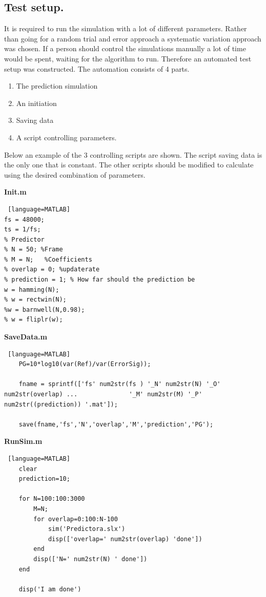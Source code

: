 \subsection{Test setup.}
It is required to run the simulation with a lot of different parameters. Rather than going for a random trial and error approach a systematic variation approach was chosen. If a person should control the simulations manually a lot of time would be spent, waiting for the algorithm to run. Therefore an automated test setup was constructed. The automation consists of 4 parts. 
\begin{enumerate}
	\item The prediction simulation
	\item An initiation 
	\item Saving data
	\item A script controlling parameters. 
\end{enumerate}  

Below an example of the 3 controlling scripts are shown. The script saving data is the only one that is constant. The other scripts should be modified to calculate using the desired combination of parameters.

\textbf{Init.m}
\begin{lstlisting} [language=MATLAB]
fs = 48000;
ts = 1/fs; 
% Predictor 
% N = 50; %Frame
% M = N;   %Coefficients
% overlap = 0; %updaterate
% prediction = 1; % How far should the prediction be
w = hamming(N); 
% w = rectwin(N);
%w = barnwell(N,0.98);
% w = fliplr(w);
\end{lstlisting}

\textbf{SaveData.m}
\begin{lstlisting} [language=MATLAB]
	PG=10*log10(var(Ref)/var(ErrorSig));
	
	fname = sprintf(['fs' num2str(fs ) '_N' num2str(N) '_O' num2str(overlap) ...              '_M' num2str(M) '_P' num2str((prediction)) '.mat']);
	
	save(fname,'fs','N','overlap','M','prediction','PG');
\end{lstlisting}

\textbf{RunSim.m}
\begin{lstlisting} [language=MATLAB]
	clear 
	prediction=10;
	
	for N=100:100:3000
		M=N;
		for overlap=0:100:N-100
			sim('Predictora.slx')
			disp(['overlap=' num2str(overlap) 'done'])
		end
		disp(['N=' num2str(N) ' done'])
	end
	
	disp('I am done')	
\end{lstlisting}


